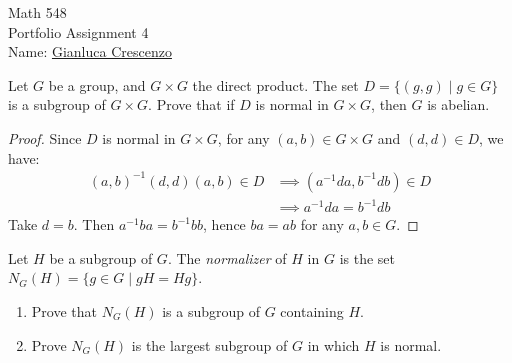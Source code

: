 \documentclass[10pt,twoside,openany]{memoir}
\begin{document}
\begin{center}
    {\Large Math 548 \\[0.1in]Portfolio Assignment 4}\\[.175in]
    {Name:} {\underline{Gianluca Crescenzo\hspace*{2in}}}\\[0.15in]
    \end{center}
    \vspace{4pt}
\begin{problem}[F24, P1]
Let $G$ be a group, and $G \times G$ the direct product. The set $D = \{(g,g) \mid g \in G\}$ is a subgroup of $G \times G$. Prove that if $D$ is normal in $G \times G$, then $G$ is abelian.
\end{problem}
    \begin{proof}
        Since $D$ is normal in $G \times G$, for any $(a,b) \in G\times G$ and $(d,d) \in D$, we have:
            \begin{equation*}
            \begin{split}
                (a,b)^{-1}(d,d)(a,b) \in D
                & \implies (a^{-1}da,b^{-1}db) \in D \\
                & \implies a^{-1}da = b^{-1}db
            \end{split}
            \end{equation*}
        Take $d = b$. Then $a^{-1}ba = b^{-1}bb$, hence $ba = ab$ for any $a,b \in G$.
    \end{proof}
\begin{problem}[W21, P3]
    Let $H$ be a subgroup of $G$. The \textit{normalizer} of $H$ in $G$ is the set $N_G(H) = \{g \in G \mid gH = Hg\}$.
        \begin{enumerate}[label = (\alph*),itemsep=1pt,topsep=3pt]
            \item Prove that $N_G(H)$ is a subgroup of $G$ containing $H$.
            \item Prove $N_G(H)$ is the largest subgroup of $G$ in which $H$ is normal.
        \end{enumerate}
\end{problem}
\end{document}
